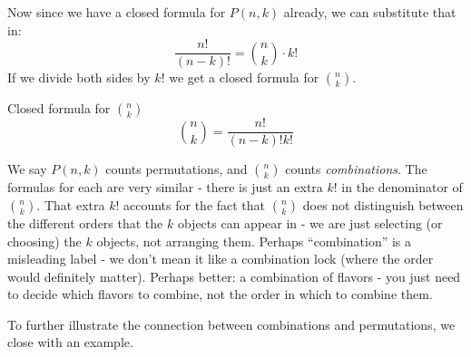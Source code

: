 \documentclass[12pt]{article}
\begin{document}
Now since we have a closed formula for $P(n,k)$ already, we can substitute that in:
\[\frac{n!}{(n-k)!} = {n \choose k} \cdot k!\]
If we divide both sides by $k!$ we get a closed formula for ${n \choose k}$.

\begin{defbox}{Closed formula for ${n \choose k}$}
  \[{n \choose k} = \frac{n!}{(n-k)!k!}\]
\end{defbox}

We say $P(n,k)$ counts permutations, and ${n \choose k}$ counts {\em combinations}.  The formulas for each are very similar - there is just an extra $k!$ in the denominator of ${n \choose k}$.  That extra $k!$ accounts for the fact that ${n \choose k}$ does not distinguish between the different orders that the $k$ objects can appear in - we are just selecting (or choosing) the $k$ objects, not arranging them.  Perhaps ``combination'' is a misleading label - we don't mean it like a combination lock (where the order would definitely matter).  Perhaps better: a combination of flavors - you just need to decide which flavors to combine, not the order in which to combine them.

To further illustrate the connection between combinations and permutations, we close with an example.
\end{document}
